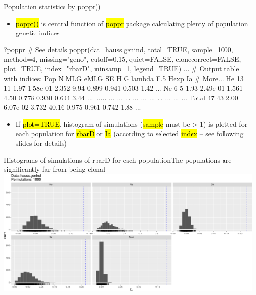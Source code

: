 \documentclass[compress, ucs, xelatex, 11pt, xcolor=svgnames,
  hyperref={
    bookmarks=true,
    unicode=true,
    colorlinks=true,
    pdftitle={Molecular data in R},
    plainpages=false,
    pdfauthor={Vojtech Zeisek},
    pdfsubject={Course about phylogeny and evolution in R},
    pdfcreator={XeLaTeX},
    pdfkeywords={R, evolution, phylogeny, molecular data},
    linkcolor=Tomato,
    anchorcolor=SaddleBrown,
    citecolor=Goldenrod,
    filecolor=DarkMagenta,
    menucolor=Sienna,
    urlcolor=DarkTurquoise,
    pdftex},
  url={hyphens, lowtilde} %
  ]{beamer}
\renewcommand{\texttt}[1]{\hl{\ttfamily #1}}
\begin{document}
\begin{frame}[fragile]{Population statistics by poppr()}
  \vfill
  \begin{itemize}
    \item \texttt{poppr()} is central function of \texttt{poppr} package calculating plenty of population genetic indices
  \end{itemize}
  \vfill
  \begin{spluscode}
    ?poppr # See details
    poppr(dat=hauss.genind, total=TRUE, sample=1000, method=4,
      missing="geno", cutoff=0.15, quiet=FALSE, clonecorrect=FALSE,
      plot=TRUE, index="rbarD", minsamp=1, legend=TRUE)
    ... # Output table with indices:
      Pop  N MLG eMLG       SE     H     G lambda   E.5  Hexp   Ia # More...
       He 13  11 1.97 1.58e-01 2.352  9.94  0.899 0.941 0.503 1.42 ...
       Ne  6   5 1.93 2.49e-01 1.561  4.50  0.778 0.930 0.604 3.44 ...
      ...... ...  ...      ...   ...   ...    ...   ...   ...  ... ...
    Total 47  43 2.00 6.07e-02 3.732 40.16  0.975 0.961 0.742 1.88 ...
  \end{spluscode}
  \vfill
  \begin{itemize}
    \item If \texttt{plot=TRUE}, histogram of simulations (\texttt{sample} must be > 1) is plotted for each population for \texttt{rbarD} or \texttt{Ia} (according to selected \texttt{index} -- see following slides for details)
  \end{itemize}
  \vfill
\end{frame}

\begin{frame}{Histograms of simulations of rbarD for each population}{The populations are significantly far from being clonal}
  \includegraphics[width=\textwidth]{poppr.png}
\end{frame}
\end{document}
